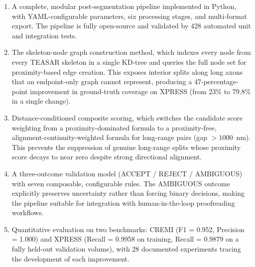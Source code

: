 \begin{enumerate}
  \item A complete, modular post-segmentation pipeline implemented in
        Python, with YAML-configurable parameters, six processing stages, and
        multi-format export. The pipeline is fully open-source and validated by
        428 automated unit and integration tests.

  \item The skeleton-node graph construction method, which indexes every
        node from every TEASAR skeleton in a single KD-tree and queries the full
        node set for proximity-based edge creation. This exposes interior splits
        along long axons that an endpoint-only graph cannot represent, producing
        a 47-percentage-point improvement in ground-truth coverage on XPRESS (from 23\%
        to 79.8\% in a single change).

  \item Distance-conditioned composite scoring, which switches the
        candidate score weighting from a proximity-dominated formula to a
        proximity-free, alignment-continuity-weighted formula for long-range
        pairs (gap $> 1000$~nm). This prevents the suppression of genuine long-range
        splits whose proximity score decays to near zero despite strong directional
        alignment.

  \item A three-outcome validation model (ACCEPT / REJECT / AMBIGUOUS)
        with seven composable, configurable rules. The AMBIGUOUS outcome
        explicitly preserves uncertainty rather than forcing binary decisions,
        making the pipeline suitable for integration with human-in-the-loop
        proofreading workflows.

  \item Quantitative evaluation on two benchmarks: CREMI (F1 = 0.952,
        Precision = 1.000) and XPRESS (Recall = 0.9958 on training, Recall = 0.9879
        on a fully held-out validation volume), with 28 documented experiments
        tracing the development of each improvement.
\end{enumerate}

